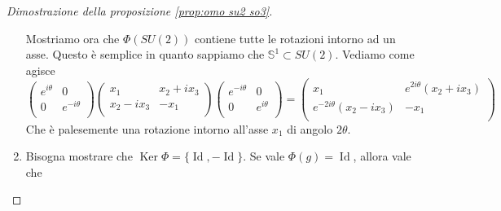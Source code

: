 \documentclass[11pt]{article}
\theoremstyle{plain}
\theoremstyle{definition}
\theoremstyle{remark}
\DeclareMathOperator{\Ker}{Ker}
\DeclareMathOperator{\Id}{Id}
\begin{document}
\begin{proof}[Dimostrazione della proposizione \ref{prop:omo su2 so3}]
\begin{enumerate}
{     Mostriamo ora che $\Phi(SU(2))$ contiene tutte le rotazioni intorno ad un asse. Questo è semplice in quanto sappiamo che $\mathbb{S}^1 \subset SU(2)$. Vediamo come agisce
     \[
     \left(
     \begin{array}{cc}
       e^{i\theta} & 0 \\
       0 & e^{-i\theta} \\
     \end{array}
     \right)
     \left(
     \begin{array}{cc}
       x_1 & x_2 + i x_3 \\
       x_2 - ix_3 & -x_1 \\
     \end{array}
     \right)
     \left(
     \begin{array}{cc}
       e^{-i\theta} & 0 \\
       0 & e^{i\theta} \\
     \end{array}
     \right)
     =
     \left(
     \begin{array}{cc}
       x_1 & e^{2i\theta}(x_2 + i x_3) \\
       e^{-2i\theta}(x_2 - ix_3) & -x_1 \\
     \end{array}
     \right)
     \]
     Che è palesemente una rotazione intorno all'asse $x_1$ di angolo $2\theta$.
   }
   \item{
     Bisogna mostrare che $\Ker \Phi = \{\Id, -\Id\}$. Se vale $\Phi(g) = \Id$, allora vale che 

}
\end{enumerate}
\end{proof}
\end{document}
